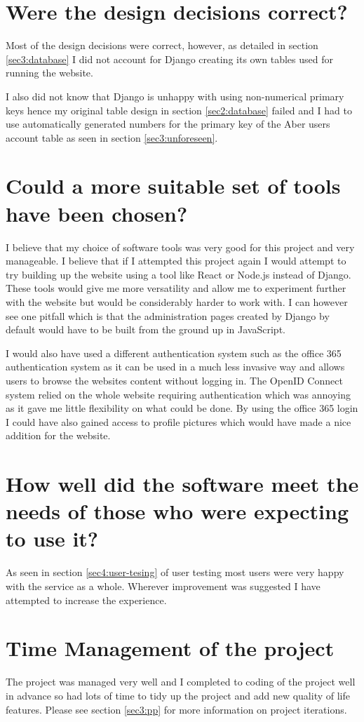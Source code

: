 \section{Were the design decisions correct?}
Most of the design decisions were correct, however, as detailed in section \ref{sec3:database} I did not account for Django creating its own tables used for running the website. 

I also did not know that Django is unhappy with using non-numerical primary keys hence my original table design in section \ref{sec2:database} failed and I had to use automatically generated numbers for the primary key of the Aber users account table as seen in section \ref{sec3:unforeseen}.

\section{Could a more suitable set of tools have been chosen?}
I believe that my choice of software tools was very good for this project and very manageable. I believe that if I attempted this project again I would attempt to try building up the website using a tool like React or Node.js instead of Django. These tools would give me more versatility and allow me to experiment further with the website but would be considerably harder to work with. I can however see one pitfall which is that the administration pages created by Django by default would have to be built from the ground up in JavaScript.

I would also have used a different authentication system such as the office 365 authentication system as it can be used in a much less invasive way and allows users to browse the websites content without logging in. The OpenID Connect system relied on the whole website requiring authentication which was annoying as it gave me little flexibility on what could be done. By using the office 365 login I could have also gained access to profile pictures which would have made a nice addition for the website.

\section{How well did the software meet the needs of those who were expecting to use it?}
As seen in section \ref{sec4:user-tesing} of user testing most users were very happy with the service as a whole. Wherever improvement was suggested I have attempted to increase the experience.

\section{Time Management of the project}
The project was managed very well and I completed to coding of the project well in advance so had lots of time to tidy up the project and add new quality of life features. Please see section \ref{sec3:pp} for more information on project iterations.

